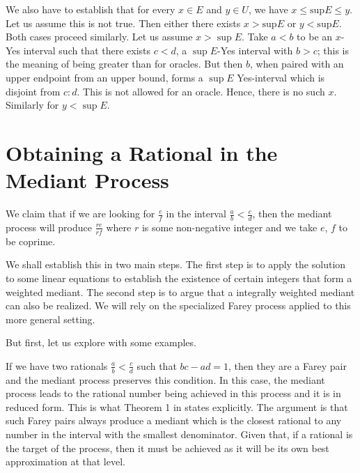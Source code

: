\documentclass[12pt]{article}
\theoremstyle{remark}
\begin{document}
We also have to establish that for every $x \in E$ and $y \in U$, we have $x \leq \mathrm{sup} E \leq y$. Let us assume this is not true. Then either there exists $x > \mathrm{sup} E$ or $y < \mathrm{sup} E$. Both cases proceed similarly. Let us 
assume $ x > \sup E$. Take $a \lt b$ to be an $x$-Yes interval such that there exists $c \lt d$, a $\sup E$-Yes interval with $b > c$; this is the meaning of being greater than for oracles. But then $b$, when paired with an upper endpoint from an upper bound, forms a $\sup E$ Yes-interval which is disjoint from $c:d$. This is not allowed for an oracle. Hence, there is no such $x$. Similarly for $y < \sup E$. 

\section{Obtaining a Rational in the Mediant Process}\label{app:med}

We claim that if we are looking for $\frac{e}{f}$ in the interval $\frac{a}{b} \lt \frac{c}{d}$, then the mediant process will produce $\frac{re}{rf}$ where $r$ is some non-negative integer and we take $e$, $f$ to be coprime. 

We shall establish this in two main steps. The first step is to apply the solution to some linear equations to establish the existence of certain integers that form a weighted mediant. The second step is to argue that a integrally weighted mediant can also be realized.  We will rely on the specialized Farey process applied to this more general setting. 

But first, let us explore with some examples. 

If we have two rationals $\frac{a}{b} < \frac{c}{d}$ such that $bc - ad = 1$, then they are a Farey pair and the mediant process preserves this condition. In this case, the mediant process leads to the rational number being achieved in this process and it is in reduced form. This is what Theorem 1 in \cite{richards} states explicitly. The argument is that such Farey pairs always produce a mediant which is the closest rational to any number in the interval with the smallest denominator. Given that, if a rational is the target of the process, then it must be achieved as it will be its own best approximation at that level. 
\end{document}
